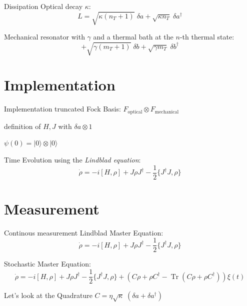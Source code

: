 \documentclass{beamer}
\DeclareMathOperator{\Tr}{Tr}
\begin{document}
\begin{frame}{Dissipation}
	Optical decay $\kappa$:
	$$L = \sqrt{\kappa (n_T+1)} \;\delta a 
		+ \sqrt{\kappa n_T} \; \delta a^\dagger$$
	
	Mechanical resonator with $\gamma$ and a thermal bath at the $n$-th thermal state:
	$$
		+ \sqrt{\gamma (m_T+1)} \;\delta b 
		+ \sqrt{\gamma m_T} \; \delta b^\dagger
	$$
\end{frame}

\section{Implementation}
\begin{frame}{Implementation}
truncated Fock Basis: $F_\text{optical} \otimes F_\text{mechanical}$

definition of $H, J$ with $\delta a \otimes 1$

$\psi(0) = |0\rangle \otimes |0\rangle$

Time Evolution using the \emph{Lindblad equation}: 
$$
	\dot\rho = -i[H,\rho] + J\rho J^\dagger - \frac{1}{2} \{J^\dagger J, \rho\}
$$
\end{frame}

\section{Measurement}
\begin{frame}{Continous measurement}
	\textcolor{seegrau}{
		Lindblad Master Equation:
		$$\dot\rho = -i[H,\rho] + J\rho J^\dagger - \frac{1}{2} \{J^\dagger J, \rho\}$$
	}

	Stochastic Master Equation:
	$$
		\dot\rho 
		= -i[H,\rho] 
		+ J\rho J^\dagger - \frac{1}{2} \{J^\dagger J, \rho\} 
		+ \left(C\rho + \rho C^\dagger - \Tr(C\rho + \rho C^\dagger)\right)\xi(t)
	$$

	Let's look at the Quadrature $C = \eta\sqrt{\kappa}\;(\delta a + \delta a^\dagger)$

\end{frame}
\end{document}
